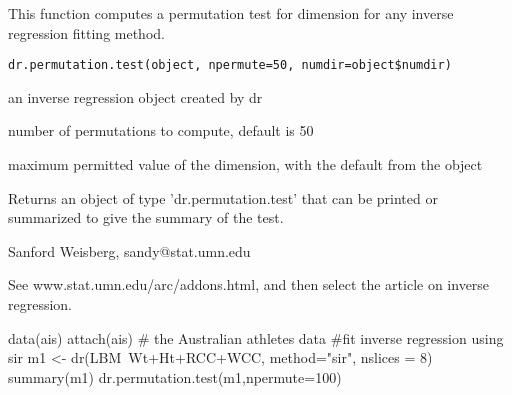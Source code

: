 \begin{Description}\relax
This function computes a permutation test for dimension for any inverse 
regression fitting method.\end{Description}
\begin{Usage}
\begin{verbatim}
dr.permutation.test(object, npermute=50, numdir=object$numdir)
\end{verbatim}
\end{Usage}
\begin{Arguments}
\begin{ldescription}
\item[\code{object}] an inverse regression object created by dr
\item[\code{npermute}] number of permutations to compute, default is 50
\item[\code{numdir}] maximum permitted value of the dimension, with the default from
the object
\end{ldescription}
\end{Arguments}
\begin{Value}
Returns an object of type 'dr.permutation.test' that can be printed or
summarized to give the summary of the test.\end{Value}
\begin{Author}\relax
Sanford Weisberg, sandy@stat.umn.edu\end{Author}
\begin{References}\relax
See www.stat.umn.edu/arc/addons.html, and then select the article
on inverse regression.\end{References}
\begin{SeeAlso}\relax
{}\end{SeeAlso}
\begin{Examples}
\begin{ExampleCode}
data(ais)
attach(ais)  # the Australian athletes data
#fit inverse regression using sir
m1 <- dr(LBM~Wt+Ht+RCC+WCC, method="sir", nslices = 8)
summary(m1)
dr.permutation.test(m1,npermute=100)
\end{ExampleCode}
\end{Examples}

